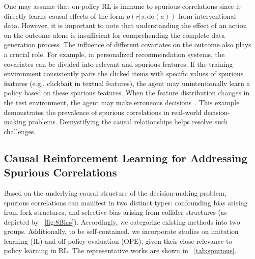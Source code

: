 \documentclass[10pt]{article} %
\theoremstyle{definition}
\begin{document}
One may assume that on-policy RL is immune to spurious correlations since it directly learns causal effects of the form $p(r|s, \mbox{do}(a))$ from interventional data. However, it is important to note that understanding the effect of an action on the outcome alone is insufficient for comprehending the complete data generation process. The influence of different covariates on the outcome also plays a crucial role. For example, in personalized recommendation systems, the covariates can be divided into relevant and spurious features. If the training environment consistently pairs the clicked items with specific values of spurious features (e.g., clickbait in textual features), the agent may unintentionally learn a policy based on these spurious features. When the feature distribution changes in the test environment, the agent may make erroneous decisions~\citep{gaoCausalInferenceRecommender2022a}. This example demonstrates the prevalence of spurious correlations in real-world decision-making problems. Demystifying the causal relationships helps resolve such challenges.

\subsection{Causal Reinforcement Learning for Addressing Spurious Correlations}
\label{subsec:4.3spurious}
 
Based on the underlying causal structure of the decision-making problem, spurious correlations can manifest in two distinct types: confounding bias arising from fork structures, and selective bias arising from collider structures (as depicted by \figurename~\ref{fig:8Bias}). Accordingly, we categorize existing methods into two groups. Additionally, to be self-contained, we incorporate studies on imitation learning (IL) and off-policy evaluation (OPE), given their close relevance to policy learning in RL.
The representative works are shown in \tablename~\ref{tab:spurious}.
\end{document}
